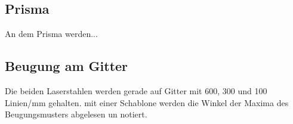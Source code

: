 \subsection{Prisma}
An dem Prisma werden... 




\subsection{Beugung am Gitter}
Die beiden Laserstahlen werden gerade auf Gitter mit \num{600}, \num{300} und \num{100} Linien/\unit{\mm} gehalten.
mit einer Schablone werden die Winkel der Maxima des Beugungsmusters abgelesen un notiert.